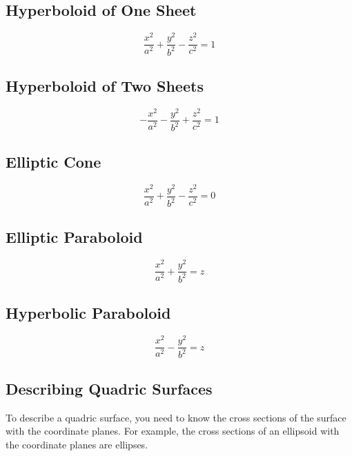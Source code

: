 \subsection{Hyperboloid of One Sheet}
\begin{equation}\label{Equation of a Hyperboloid of One Sheet}
    \dfrac{x^2}{a^2} + \dfrac{y^2}{b^2} - \dfrac{z^2}{c^2} = 1
\end{equation}

\subsection{Hyperboloid of Two Sheets}
\begin{equation}\label{Equation of a Hyperboloid of Two Sheets}
    -\dfrac{x^2}{a^2} - \dfrac{y^2}{b^2} + \dfrac{z^2}{c^2} = 1
\end{equation}

\subsection{Elliptic Cone}
\begin{equation}\label{Equation of an Elliptic Cone}
    \dfrac{x^2}{a^2} + \dfrac{y^2}{b^2} - \dfrac{z^2}{c^2} = 0
\end{equation}

\subsection{Elliptic Paraboloid}
\begin{equation}\label{Equation of an Elliptic Paraboloid}
    \dfrac{x^2}{a^2} + \dfrac{y^2}{b^2} = z
\end{equation}

\subsection{Hyperbolic Paraboloid}
\begin{equation}\label{Equation of a Hyperbolic Paraboloid}
    \dfrac{x^2}{a^2} - \dfrac{y^2}{b^2} = z
\end{equation}

\subsection{Describing Quadric Surfaces}
To describe a quadric surface, you need to know the cross sections of the surface with the coordinate planes. For example, the cross sections of an ellipsoid with the coordinate planes are ellipses.

